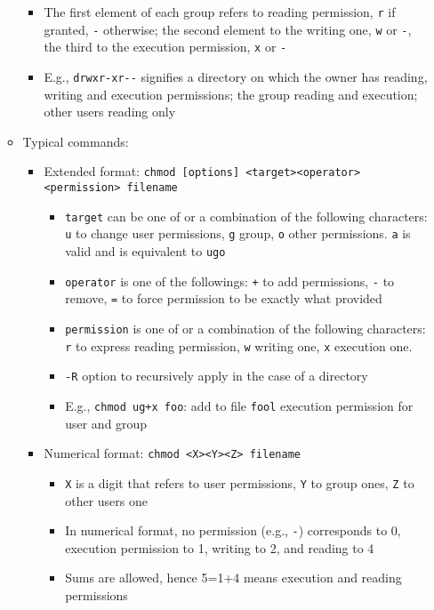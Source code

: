 \documentclass[a4paper,12pt,%
              final%
              ]{article}
\begin{document}
\begin{itemize}
\begin{itemize}
\begin{itemize}
          \item The first element of each group refers to reading permission, \verb|r| if granted, \verb|-| otherwise; the second element to the writing one, \verb|w| or \verb|-|, the third to the execution permission, \verb|x| or \verb|-|
          \item E.g., \verb|drwxr-xr--| signifies a directory on which the owner has reading, writing and execution permissions; the group reading and execution; other users reading only
        \end{itemize}
      \item Typical commands:
        \begin{itemize}
          \item Extended format: \verb|chmod [options] <target><operator><permission> filename|
            \begin{itemize}
              \item \verb|target| can be one of or a combination of the following characters: \verb|u| to change user permissions, \verb|g| group, \verb|o| other permissions. \verb|a| is valid and is equivalent to \verb|ugo|
              \item \verb|operator| is one of the followings: \verb|+| to add permissions, \verb|-| to remove, \verb|=| to force permission to be exactly what provided
              \item \verb|permission| is one of or a combination of the following characters: \verb|r| to express reading permission, \verb|w| writing one, \verb|x| execution one.
              \item \verb|-R| option to recursively apply in the case of a directory
              \item E.g., \verb|chmod ug+x foo|: add to file \texttt{fool} execution permission for user and group
            \end{itemize}
          \item Numerical format: \verb|chmod <X><Y><Z> filename|
            \begin{itemize}
              \item \verb|X| is a digit that refers to user permissions, \verb|Y| to group ones, \verb|Z| to other users one
              \item In numerical format, no permission (e.g., \verb|-|) corresponds to 0, execution permission to 1, writing to 2, and reading to 4
              \item Sums are allowed, hence 5=1+4 means execution and reading permissions

\end{itemize}
\end{itemize}
\end{itemize}
\end{itemize}
\end{document}
